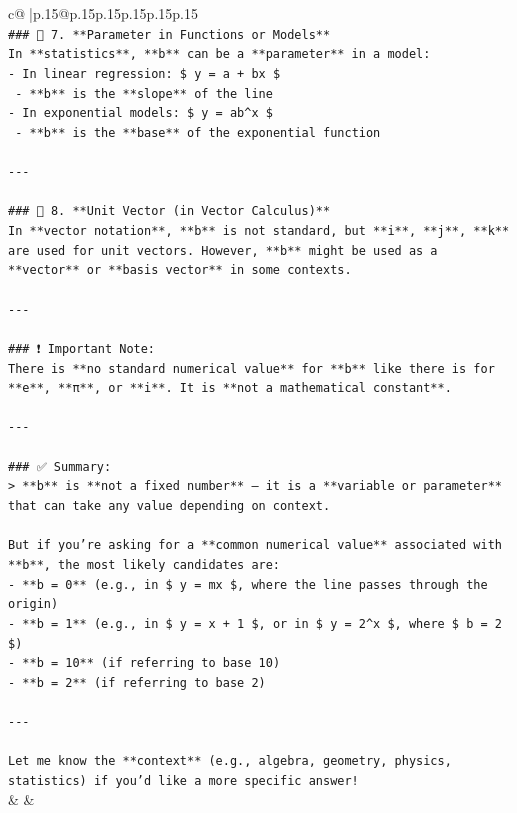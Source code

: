 \documentclass{article}
\begin{document}
{\begin{supertabular}{c@{$\;$}|p{.15\linewidth}@{}p{.15\linewidth}p{.15\linewidth}p{.15\linewidth}p{.15\linewidth}p{.15\linewidth}}
{{{\\ 
\texttt{\#\#\# 🔹 7. **Parameter in Functions or Models**} \\
\texttt{In **statistics**, **b** can be a **parameter** in a model:} \\
\texttt{{-} In linear regression: \$ y = a + bx \$} \\
\texttt{  {-} **b** is the **slope** of the line} \\
\texttt{{-} In exponential models: \$ y = ab\^{}x \$} \\
\texttt{  {-} **b** is the **base** of the exponential function} \\
\\ 
\texttt{{-}{-}{-}} \\
\\ 
\texttt{\#\#\# 🔹 8. **Unit Vector (in Vector Calculus)**} \\
\texttt{In **vector notation**, **b** is not standard, but **i**, **j**, **k** are used for unit vectors. However, **b** might be used as a **vector** or **basis vector** in some contexts.} \\
\\ 
\texttt{{-}{-}{-}} \\
\\ 
\texttt{\#\#\# ❗ Important Note:} \\
\texttt{There is **no standard numerical value** for **b** like there is for **e**, **π**, or **i**. It is **not a mathematical constant**.} \\
\\ 
\texttt{{-}{-}{-}} \\
\\ 
\texttt{\#\#\# ✅ Summary:} \\
\texttt{> **b** is **not a fixed number** — it is a **variable or parameter** that can take any value depending on context.} \\
\\ 
\texttt{But if you're asking for a **common numerical value** associated with **b**, the most likely candidates are:} \\
\texttt{{-} **b = 0** (e.g., in \$ y = mx \$, where the line passes through the origin)} \\
\texttt{{-} **b = 1** (e.g., in \$ y = x + 1 \$, or in \$ y = 2\^{}x \$, where \$ b = 2 \$)} \\
\texttt{{-} **b = 10** (if referring to base 10)} \\
\texttt{{-} **b = 2** (if referring to base 2)} \\
\\ 
\texttt{{-}{-}{-}} \\
\\ 
\texttt{Let me know the **context** (e.g., algebra, geometry, physics, statistics) if you'd like a more specific answer!} \\
            }
        }
    }
    & & \\ \\


\end{supertabular}}
\end{document}

